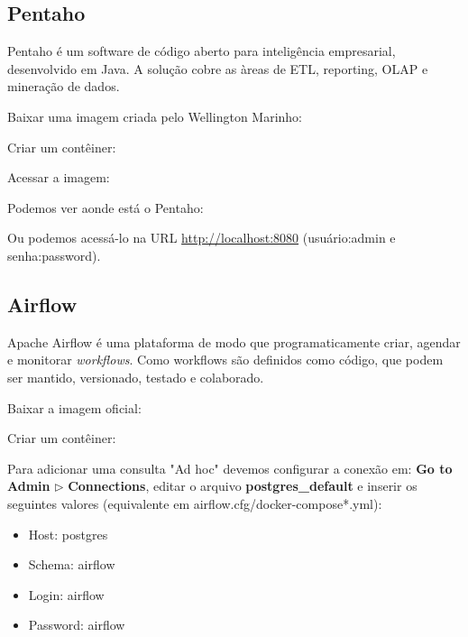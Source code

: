 \documentclass[a4paper,11pt]{article}
\begin{document}
\subsection{Pentaho}
Pentaho é um software de código aberto para inteligência empresarial, desenvolvido em Java. A solução cobre as àreas de ETL, reporting, OLAP e mineração de dados. 

Baixar uma imagem criada pelo Wellington Marinho: \\

Criar um contêiner: \\

Acessar a imagem: \\

Podemos ver aonde está o Pentaho: \\

Ou podemos acessá-lo na URL \url{http://localhost:8080} (usuário:admin e senha:password).

\subsection{Airflow}
Apache Airflow é uma plataforma de modo que programaticamente criar, agendar e monitorar \textit{workflows}. Como workflows são definidos como código, que podem ser mantido, versionado, testado e colaborado. 

Baixar a imagem oficial: \\

Criar um contêiner: \\

Para adicionar uma consulta "Ad hoc" devemos configurar a conexão em: \textbf{Go to Admin} $\triangleright$ \textbf{Connections}, editar o arquivo \textbf{postgres\_default} e inserir os seguintes valores (equivalente em airflow.cfg/docker-compose*.yml): \vspace{-1em}
\begin{itemize}[noitemsep]
	\item Host: postgres
	\item Schema: airflow
	\item Login: airflow
	\item Password: airflow
\end{itemize}
\end{document}
